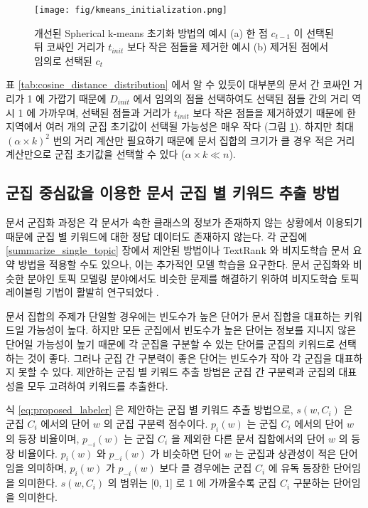 \documentclass[oneside, ko,phd]{snuthesis_utf8_kor}
\begin{document}
\begin{figure}[H]
\centering
\texttt{[image: fig/kmeans\_initialization.png]}
\caption{개선된 Spherical k-means 초기화 방법의 예시 (a) 한 점 $c_{t-1}$ 이 선택된 뒤 코싸인 거리가 $t_{init}$ 보다 작은 점들을 제거한 예시 (b) 제거된 점에서 임의로 선택된 $c_t$}
\label{fig:initialization}
\end{figure}

표 \ref{tab:cosine_distance_distribution} 에서 알 수 있듯이 대부분의 문서 간 코싸인 거리가 1 에 가깝기 때문에 $D_{init}$ 에서 임의의 점을 선택하여도 선택된 점들 간의 거리 역시 1 에 가까우며, 선택된 점들과 거리가 $t_{init}$ 보다 작은 점들을 제거하였기 때문에 한 지역에서 여러 개의 군집 초기값이 선택될 가능성은 매우 작다 (그림 \ref{fig:initialization}).
하지만 최대 $(\alpha \times k)^2$ 번의 거리 계산만 필요하기 때문에 문서 집합의 크기가 클 경우 적은 거리 계산만으로 군집 초기값을 선택할 수 있다 ($\alpha \times k \ll n$).


\subsection{군집 중심값을 이용한 문서 군집 별 키워드 추출 방법}

문서 군집화 과정은 각 문서가 속한 클래스의 정보가 존재하지 않는 상황에서 이용되기 때문에 군집 별 키워드에 대한 정답 데이터도 존재하지 않는다.
각 군집에 \ref{summarize_single_topic} 장에서 제안된 방법이나 TextRank 와 비지도학습 문서 요약 방법을 적용할 수도 있으나, 이는 추가적인 모델 학습을 요구한다.
문서 군집화와 비슷한 분야인 토픽 모델링 분야에서도 비슷한 문제를 해결하기 위하여 비지도학습 토픽 레이블링 기법이 활발히 연구되었다 \cite{newman2010evaluating, sievert2014ldavis, chuang2012interpretation, snyder2013topic, chuang2012termite, blei2003latent}.

문서 집합의 주제가 단일할 경우에는 빈도수가 높은 단어가 문서 집합을 대표하는 키워드일 가능성이 높다.
하지만 모든 군집에서 빈도수가 높은 단어는 정보를 지니지 않은 단어일 가능성이 높기 때문에 각 군집을 구분할 수 있는 단어를 군집의 키워드로 선택하는 것이 좋다.
그러나 군집 간 구분력이 좋은 단어는 빈도수가 작아 각 군집을 대표하지 못할 수 있다.
제안하는 군집 별 키워드 추출 방법은 군집 간 구분력과 군집의 대표성을 모두 고려하여 키워드를 추출한다.

식 \ref{eq:proposed_labeler} 은 제안하는 군집 별 키워드 추출 방법으로, $s(w, C_i)$ 은 군집 $C_i$ 에서의 단어 $w$ 의 군집 구분력 점수이다.
$p_i (w)$ 는 군집 $C_i$ 에서의 단어 $w$ 의 등장 비율이며, $p_{-i} (w)$ 는 군집 $C_i$ 을 제외한 다른 문서 집합에서의 단어 $w$ 의 등장 비율이다.
$p_i (w)$ 와 $p_{-i} (w)$ 가 비슷하면 단어 $w$ 는 군집과 상관성이 적은 단어임을 의미하며, $p_i (w)$ 가 $p_{-i} (w)$ 보다 클 경우에는 군집 $C_i$ 에 유독 등장한 단어임을 의미한다.
$s(w, C_i)$ 의 범위는 [0, 1] 로 1 에 가까울수록 군집 $C_i$ 구분하는 단어임을 의미한다.
\end{document}
